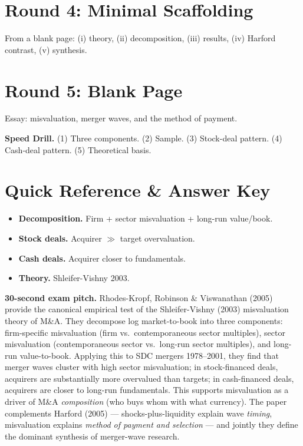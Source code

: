 \documentclass[11pt]{article}
\begin{document}
\section*{Round 4: Minimal Scaffolding}
From a blank page: (i) theory, (ii) decomposition, (iii) results, (iv) Harford contrast, (v) synthesis.

\section*{Round 5: Blank Page}
Essay: misvaluation, merger waves, and the method of payment.

\vspace{6pt}
\begin{drillbox}
\textbf{Speed Drill.} (1) Three components. (2) Sample. (3) Stock-deal pattern. (4) Cash-deal pattern. (5) Theoretical basis.
\end{drillbox}

\section*{Quick Reference \& Answer Key}
\begin{answerbox}
\begin{itemize}
\item \textbf{Decomposition.} Firm + sector misvaluation + long-run value/book.
\item \textbf{Stock deals.} Acquirer $\gg$ target overvaluation.
\item \textbf{Cash deals.} Acquirer closer to fundamentals.
\item \textbf{Theory.} Shleifer-Vishny 2003.
\end{itemize}
\end{answerbox}

\begin{keybox}
\textbf{30-second exam pitch.} Rhodes-Kropf, Robinson \& Viswanathan (2005) provide the canonical empirical test of the Shleifer-Vishny (2003) misvaluation theory of M\&A. They decompose log market-to-book into three components: firm-specific misvaluation (firm vs.\ contemporaneous sector multiples), sector misvaluation (contemporaneous sector vs.\ long-run sector multiples), and long-run value-to-book. Applying this to SDC mergers 1978--2001, they find that merger waves cluster with high sector misvaluation; in stock-financed deals, acquirers are substantially more overvalued than targets; in cash-financed deals, acquirers are closer to long-run fundamentals. This supports misvaluation as a driver of M\&A \emph{composition} (who buys whom with what currency). The paper complements Harford (2005) --- shocks-plus-liquidity explain wave \emph{timing}, misvaluation explains \emph{method of payment and selection} --- and jointly they define the dominant synthesis of merger-wave research.
\end{keybox}
\end{document}
